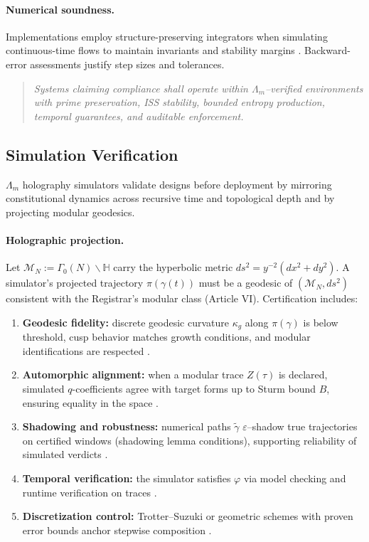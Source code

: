 \documentclass[12pt]{amsart}
\theoremstyle{plain}
\begin{document}
\paragraph{Numerical soundness.}
Implementations employ structure-preserving integrators when simulating continuous-time flows to maintain invariants and stability margins \cite{hairer2006geometric}. Backward-error assessments justify step sizes and tolerances.

\begin{quote}
\textit{Systems claiming compliance shall operate within $\Lambda_m$–verified environments with prime preservation, ISS stability, bounded entropy production, temporal guarantees, and auditable enforcement.}
\end{quote}

\subsection{Simulation Verification}

$\Lambda_m$ holography simulators validate designs before deployment by mirroring constitutional dynamics across recursive time and topological depth and by projecting modular geodesics.

\paragraph{Holographic projection.}
Let $\mathcal{M}_N:=\Gamma_0(N)\backslash\mathbb{H}$ carry the hyperbolic metric $ds^2=y^{-2}(dx^2+dy^2)$. A simulator’s projected trajectory $\pi(\gamma(t))$ must be a geodesic of $(\mathcal{M}_N,ds^2)$ consistent with the Registrar’s modular class (Article VI). Certification includes:
\begin{enumerate}
  \item \textbf{Geodesic fidelity:} discrete geodesic curvature $\kappa_g$ along $\pi(\gamma)$ is below threshold, cusp behavior matches growth conditions, and modular identifications are respected \cite{iwaniec2002spectral,katok1992fuchsian}.
  \item \textbf{Automorphic alignment:} when a modular trace $Z(\tau)$ is declared, simulated $q$-coefficients agree with target forms up to Sturm bound $B$, ensuring equality in the space \cite{sturm1987congruence,diamond2005first}.
  \item \textbf{Shadowing and robustness:} numerical paths $\tilde{\gamma}$ $\varepsilon$–shadow true trajectories on certified windows (shadowing lemma conditions), supporting reliability of simulated verdicts \cite{pilyugin1999shadowing}.
  \item \textbf{Temporal verification:} the simulator satisfies $\varphi$ via model checking and runtime verification on traces \cite{baier2008model,clarke1999model}.
  \item \textbf{Discretization control:} Trotter–Suzuki or geometric schemes with proven error bounds anchor stepwise composition \cite{trotter1959product,suzuki1976generalized,hairer2006geometric}.
\end{enumerate}
\end{document}
